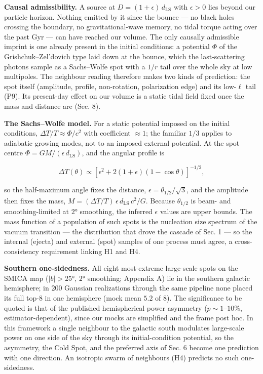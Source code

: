 \documentclass[
]{article}
\begin{document}
\textbf{Causal admissibility.} A source at
\(D = (1+\epsilon)\,d_{\text{LS}}\) with \(\epsilon > 0\) lies beyond
our particle horizon. Nothing emitted by it since the bounce --- no
black holes crossing the boundary, no gravitational-wave memory, no
tidal torque acting over the past Gyr --- can have reached our volume.
The only causally admissible imprint is one already present in the
initial conditions: a potential \(\Phi\) of the Grishchuk--Zel'dovich
type laid down at the bounce, which the last-scattering photons sample
as a Sachs--Wolfe spot with a \(1/r\) tail over the whole sky at low
multipoles. The neighbour reading therefore makes two kinds of
prediction: the spot itself (amplitude, profile, non-rotation,
polarization edge) and its low-\(\ell\) tail (P9). Its present-day
effect on our volume is a static tidal field fixed once the mass and
distance are (Sec. 8).

\textbf{The Sachs--Wolfe model.} For a static potential imposed on the
initial conditions, \(\Delta T/T \approx \Phi/c^2\) with coefficient
\(\approx 1\); the familiar \(1/3\) applies to adiabatic growing modes,
not to an imposed external potential. At the spot centre
\(\Phi = GM/(\epsilon\,d_{\text{LS}})\), and the angular profile is

\[\Delta T(\theta) \propto \left[\epsilon^2 + 2(1+\epsilon)(1-\cos\theta)\right]^{-1/2},\]

so the half-maximum angle fixes the distance,
\(\epsilon = \theta_{1/2}/\sqrt{3}\), and the amplitude then fixes the
mass, \(M = (\Delta T/T)\,\epsilon\,d_{\text{LS}}\,c^2/G\). Because
\(\theta_{1/2}\) is beam- and smoothing-limited at \(2°\) smoothing, the
inferred \(\epsilon\) values are upper bounds. The mass function of a
population of such spots is the nucleation size spectrum of the vacuum
transition --- the distribution that drove the cascade of Sec. 1 --- so
the internal (ejecta) and external (spot) samples of one process must
agree, a cross-consistency requirement linking H1 and H4.

\textbf{Southern one-sidedness.} All eight most-extreme large-scale
spots on the SMICA map (\(|b| > 25°\), \(2°\) smoothing; Appendix A) lie
in the southern galactic hemisphere; in 200 Gaussian realizations
through the same pipeline none placed its full top-8 in one hemisphere
(mock mean \(5.2\) of \(8\)). The significance to be quoted is that of
the published hemispherical power asymmetry (\(p \sim 1\)--\(10\%\),
estimator-dependent), since our mocks are simplified and the frame post
hoc. In this framework a single neighbour to the galactic south
modulates large-scale power on one side of the sky through its
initial-condition potential, so the asymmetry, the Cold Spot, and the
preferred axis of Sec. 6 become one prediction with one direction. An
isotropic swarm of neighbours (H4) predicts no such one-sidedness.
\end{document}
